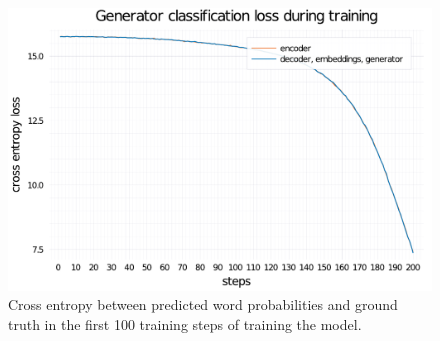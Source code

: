 \begin{figure}
    \centering
    \includegraphics[width=0.7\linewidth]{training-loss-transformer-abs-tiny.pdf}
    \caption{Cross entropy between predicted word probabilities and ground truth in the first 100 training steps of training the \TransformerAbsTiny model.}
    \label{training-loss-bert-abs}
\end{figure}
